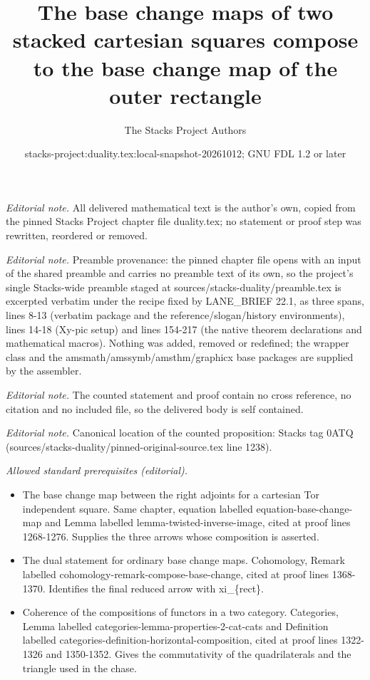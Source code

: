 \documentclass[10pt,a4paper]{amsart}
\title{The base change maps of two stacked cartesian squares compose to the base change map of the outer rectangle}
\author{The Stacks Project Authors}
\date{stacks-project:duality.tex:local-snapshot-20261012; GNU FDL 1.2 or later}
\theoremstyle{plain}
\theoremstyle{definition}
\theoremstyle{remark}
\numberwithin{equation}{subsection}
\begin{document}
\maketitle
\noindent\textit{Editorial note.} All delivered mathematical text is the author's own, copied from the pinned Stacks Project chapter file duality.tex; no statement or proof step was rewritten, reordered or removed.\par\medskip
\noindent\textit{Editorial note.} Preamble provenance: the pinned chapter file opens with an input of the shared preamble and carries no preamble text of its own, so the project's single Stacks-wide preamble staged at sources/stacks-duality/preamble.tex is excerpted verbatim under the recipe fixed by LANE\_BRIEF 22.1, as three spans, lines 8-13 (verbatim package and the reference/slogan/history environments), lines 14-18 (Xy-pic setup) and lines 154-217 (the native theorem declarations and mathematical macros). Nothing was added, removed or redefined; the wrapper class and the amsmath/amssymb/amsthm/graphicx base packages are supplied by the assembler.\par\medskip
\noindent\textit{Editorial note.} The counted statement and proof contain no cross reference, no citation and no included file, so the delivered body is self contained.\par\medskip
\noindent\textit{Editorial note.} Canonical location of the counted proposition: Stacks tag 0ATQ (sources/stacks-duality/pinned-original-source.tex line 1238).\par\medskip
\noindent\textit{Allowed standard prerequisites (editorial).}\begin{itemize}
\item The base change map between the right adjoints for a cartesian Tor independent square. Same chapter, equation labelled equation-base-change-map and Lemma labelled lemma-twisted-inverse-image, cited at proof lines 1268-1276. Supplies the three arrows whose composition is asserted.
\item The dual statement for ordinary base change maps. Cohomology, Remark labelled cohomology-remark-compose-base-change, cited at proof lines 1368-1370. Identifies the final reduced arrow with xi\_\{rect\}.
\item Coherence of the compositions of functors in a two category. Categories, Lemma labelled categories-lemma-properties-2-cat-cats and Definition labelled categories-definition-horizontal-composition, cited at proof lines 1322-1326 and 1350-1352. Gives the commutativity of the quadrilaterals and the triangle used in the chase.
\end{itemize}\medskip
\end{document}
